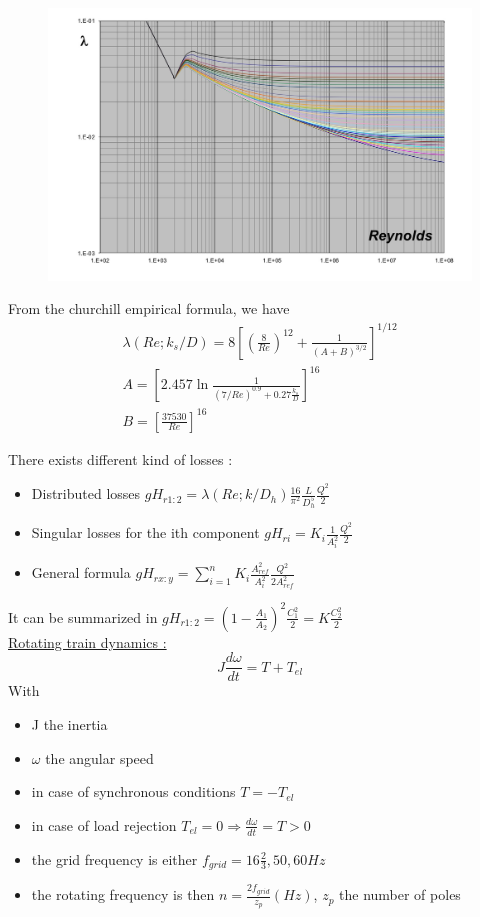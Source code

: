 \documentclass[../main.tex]{subfiles}
\begin{document}
\begin{figure}[hbt!]
    \centering
    \includegraphics[width=0.8\linewidth]{IMAGES/Hydraulic/IMG_0178.jpeg}
\end{figure}

From the churchill empirical formula, we have \begin{equation}
    \begin{gathered}
        \lambda(Re; k_s/D) = 8 [(\frac{8}{Re})^{12} + \frac{1}{(A+B)^{3/2}}]^{1/12}\\
        A = [2.457 \ln \frac{1}{(7/Re)^{0.9} + 0.27 \frac{k_s}{D}}]^{16}\\
        B = [\frac{37530}{Re}]^{16}
    \end{gathered}
\end{equation}

There exists different kind of losses : \begin{itemize}
    \item Distributed losses $gH_{r 1:2} = \lambda(Re; k/D_h) \frac{16}{\pi^2} \frac{L}{D_h^5} \frac{Q^2}{2}$
    \item Singular losses for the ith component $gH_{ri} = K_i \frac{1}{A_i^2} \frac{Q^2}{2}$
    \item General formula $gH_{r x:y} = \sum_{i=1}^n K_i \frac{A_{ref}^2}{A_i^2} \frac{Q^2}{2A_{ref}^2}$
\end{itemize}

It can be summarized in $gH_{r 1:2} = (1-\frac{A_1}{A_2})^2 \frac{C_1^2}{2} = K \frac{C_2^2}{2}$\\

\quad \underline{Rotating train dynamics :}\\
\begin{equation}
    J \frac{d\omega}{dt} = T + T_{el}
\end{equation}
With \begin{itemize}
    \item J the inertia
    \item $\omega$ the angular speed
    \item in case of synchronous conditions $T = -T_{el}$
    \item in case of load rejection $T_{el} = 0 \Rightarrow \frac{d\omega}{dt} = T>0$
    \item the grid frequency is either $f_{grid} = 16 \frac{2}{3}, 50, 60 Hz$
    \item the rotating frequency is then $n = \frac{2 f_{grid}}{z_p} (Hz)$, $z_p$ the number of poles
\end{itemize}
\end{document}
